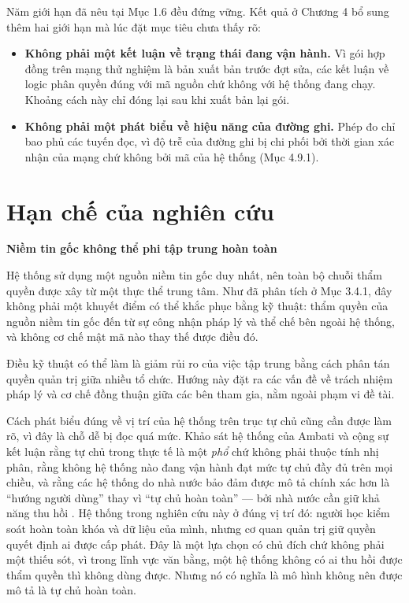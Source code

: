 Năm giới hạn đã nêu tại Mục 1.6 đều đứng vững. Kết quả ở Chương 4 bổ sung thêm hai giới hạn mà lúc đặt mục tiêu chưa thấy rõ:

\begin{itemize}
    \item \textbf{Không phải một kết luận về trạng thái đang vận hành.} Vì gói hợp đồng trên mạng thử nghiệm là bản xuất bản trước đợt sửa, các kết luận về logic phân quyền đúng với mã nguồn chứ không với hệ thống đang chạy. Khoảng cách này chỉ đóng lại sau khi xuất bản lại gói.
    \item \textbf{Không phải một phát biểu về hiệu năng của đường ghi.} Phép đo chỉ bao phủ các tuyến đọc, vì độ trễ của đường ghi bị chi phối bởi thời gian xác nhận của mạng chứ không bởi mã của hệ thống (Mục 4.9.1).
\end{itemize}

\section{Hạn chế của nghiên cứu}

\noindent \textbf{Niềm tin gốc không thể phi tập trung hoàn toàn}

Hệ thống sử dụng một nguồn niềm tin gốc duy nhất, nên toàn bộ chuỗi thẩm quyền được xây từ một thực thể trung tâm. Như đã phân tích ở Mục 3.4.1, đây không phải một khuyết điểm có thể khắc phục bằng kỹ thuật: thẩm quyền của nguồn niềm tin gốc đến từ sự công nhận pháp lý và thể chế bên ngoài hệ thống, và không cơ chế mật mã nào thay thế được điều đó.

Điều kỹ thuật có thể làm là giảm rủi ro của việc tập trung bằng cách phân tán quyền quản trị giữa nhiều tổ chức. Hướng này đặt ra các vấn đề về trách nhiệm pháp lý và cơ chế đồng thuận giữa các bên tham gia, nằm ngoài phạm vi đề tài.

Cách phát biểu đúng về vị trí của hệ thống trên trục tự chủ cũng cần được làm rõ, vì đây là chỗ dễ bị đọc quá mức. Khảo sát hệ thống của Ambati và cộng sự kết luận rằng tự chủ trong thực tế là một \emph{phổ} chứ không phải thuộc tính nhị phân, rằng không hệ thống nào đang vận hành đạt mức tự chủ đầy đủ trên mọi chiều, và rằng các hệ thống do nhà nước bảo đảm được mô tả chính xác hơn là {``}hướng người dùng{''} thay vì {``}tự chủ hoàn toàn{''} --- bởi nhà nước cần giữ khả năng thu hồi \cite{Ambati2026}. Hệ thống trong nghiên cứu này ở đúng vị trí đó: người học kiểm soát hoàn toàn khóa và dữ liệu của mình, nhưng cơ quan quản trị giữ quyền quyết định ai được cấp phát. Đây là một lựa chọn có chủ đích chứ không phải một thiếu sót, vì trong lĩnh vực văn bằng, một hệ thống không có ai thu hồi được thẩm quyền thì không dùng được. Nhưng nó có nghĩa là mô hình không nên được mô tả là tự chủ hoàn toàn.

